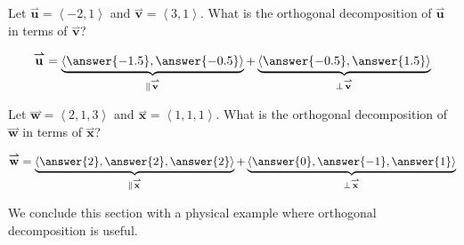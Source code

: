 \documentclass{ximera}
\begin{document}
\begin{question}
Let $\overset{\boldsymbol{\rightharpoonup}}{\mathbf{u}} = \left< -2,1 \right>$ and $\overset{\boldsymbol{\rightharpoonup}}{\mathbf{v}} = \left< 3,1 \right>$.  What is the
orthogonal decomposition of $\overset{\boldsymbol{\rightharpoonup}}{\mathbf{u}}$ in terms of $\overset{\boldsymbol{\rightharpoonup}}{\mathbf{v}}$?
\begin{prompt}
\[
\overset{\boldsymbol{\rightharpoonup}}{\mathbf{u}} = \underbrace{\left< \answer{-1.5},\answer{-0.5} \right> }_{\parallel \overset{\boldsymbol{\rightharpoonup}}{\mathbf{v}}} + \underbrace{\left< \answer{-0.5},\answer{1.5}\right>}_{\perp \overset{\boldsymbol{\rightharpoonup}}{\mathbf{v}}}
\]
\end{prompt}
\begin{question}
  Let $\overset{\boldsymbol{\rightharpoonup}}{\mathbf{w}} = \left< 2,1,3 \right>$ and $\overset{\boldsymbol{\rightharpoonup}}{\mathbf{x}}  = \left< 1,1,1 \right>$. What is the
  orthogonal decomposition of $\overset{\boldsymbol{\rightharpoonup}}{\mathbf{w}}$ in terms of $\overset{\boldsymbol{\rightharpoonup}}{\mathbf{x}}$?
  \begin{prompt}
  \[
  \overset{\boldsymbol{\rightharpoonup}}{\mathbf{w}}  = \underbrace{\left< \answer{2},\answer{2},\answer{2}\right>}_{\parallel \overset{\boldsymbol{\rightharpoonup}}{\mathbf{x}}} + \underbrace{\left< \answer{0},\answer{-1},\answer{1}\right>}_{\perp\overset{\boldsymbol{\rightharpoonup}}{\mathbf{x}}}
  \]
  \end{prompt}
\end{question}
\end{question}





We conclude this section with a physical example where orthogonal decomposition is useful.
\end{document}
